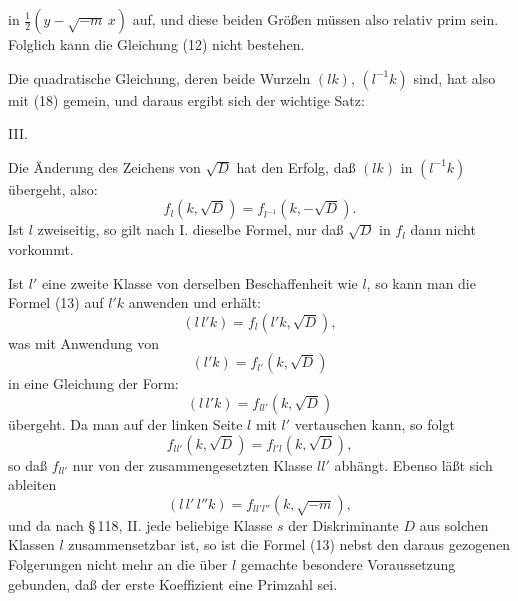 in $\frac{1}{2}(y - \sqrt{-m}\, x)$ auf, und diese beiden Größen müssen also relativ prim sein. Folglich kann die Gleichung (12) nicht bestehen.

Die quadratische Gleichung, deren beide Wurzeln $(lk)$, $(l^{-1}k)$ sind, hat also mit (18) %
 gemein, und daraus ergibt sich der wichtige Satz:

III. 

Die Änderung des Zeichens von $\sqrt{D}$ hat den Erfolg, daß $(lk)$ in $(l^{-1}k)$ übergeht, also:
\[ f_l(k, \sqrt{D}) = f_{l^{-1}}(k, -\sqrt{D}). \]
Ist $l$ zweiseitig, so gilt nach I. dieselbe Formel, nur daß $\sqrt{D}$ in $f_l$ dann nicht vorkommt.

Ist $l'$ eine zweite Klasse von derselben Beschaffenheit wie $l$, so kann man die Formel (13) auf $l'k$ anwenden und erhält:
\[ (l\, l' k) = f_l(l' k, \sqrt{D}), \]
was mit Anwendung von
\[ (l' k) = f_{l'}(k, \sqrt{D}) \]
in eine Gleichung der Form:
\[ (l\, l' k) = f_{l l'}(k, \sqrt{D}) \]
übergeht. Da man auf der linken Seite $l$ mit $l'$ vertauschen kann, so folgt
\[ f_{l l'}(k, \sqrt{D}) = f_{l' l}(k, \sqrt{D}), \]
so daß $f_{l l'}$ nur von der zusammengesetzten Klasse $l l'$ abhängt. Ebenso läßt sich ableiten
\[ (l\, l'\, l'' k) = f_{l l' l''}(k, \sqrt{-m}), \] %
und da nach \S\,118, II. jede beliebige Klasse $s$ der Diskriminante $D$ aus solchen Klassen $l$ zusammensetzbar ist, so ist die Formel (13) nebst den daraus gezogenen Folgerungen nicht mehr an die über $l$ gemachte besondere Voraussetzung gebunden, daß der erste Koeffizient eine Primzahl sei.

